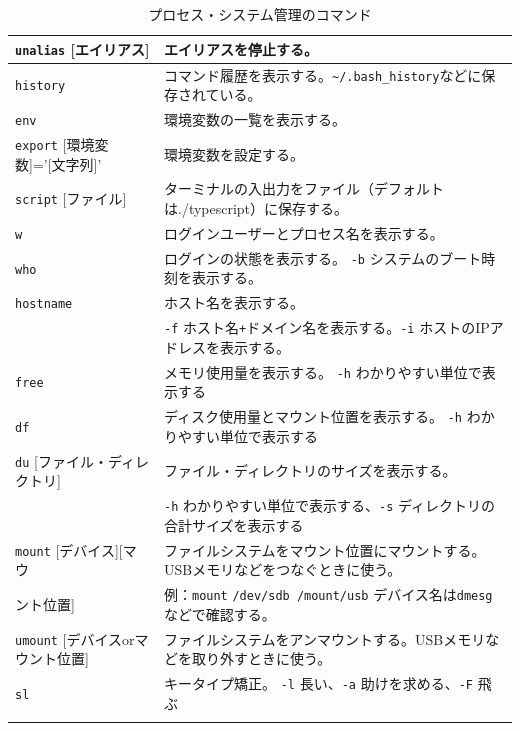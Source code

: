 \documentclass[a4j]{ltjreport}
\begin{document}
\begin{longtable}[c]{|p{3.5cm}|p{13.5cm}|}
        \hline
        \texttt{unalias} {\small [エイリアス]}&エイリアスを停止する。\\
        \hline
        \texttt{history} &コマンド履歴を表示する。\verb|~/.bash_history|などに保存されている。\\
        \hline
        \texttt{env} &環境変数の一覧を表示する。\\
        \hline
        \texttt{export} [環境変数]='[文字列]'&環境変数を設定する。\\
        \hline
        \texttt{script} [ファイル]&ターミナルの入出力をファイル（デフォルトは./typescript）に保存する。\\
        \hline
        \texttt{w} &ログインユーザーとプロセス名を表示する。\\
        \hline
        \texttt{who} &ログインの状態を表示する。 \texttt{-b} システムのブート時刻を表示する。\\
        \hline
        \texttt{hostname} &ホスト名を表示する。 \\
        &\texttt{-f} ホスト名\verb|+|ドメイン名を表示する。\texttt{-i} ホストのIPアドレスを表示する。\\
        \hline
        \texttt{free} &メモリ使用量を表示する。 \texttt{-h} わかりやすい単位で表示する\\
        \hline
        \texttt{df} &ディスク使用量とマウント位置を表示する。 \texttt{-h} わかりやすい単位で表示する\\
        \hline
        \texttt{du} {\footnotesize [ファイル・ディレクトリ]}&ファイル・ディレクトリのサイズを表示する。\\
        &\texttt{-h} わかりやすい単位で表示する、\texttt{-s} ディレクトリの合計サイズを表示する\\
        \hline
        \texttt{mount} [デバイス][マウ&ファイルシステムをマウント位置にマウントする。USBメモリなどをつなぐときに使う。\\
        ント位置]&例：\texttt{mount} \verb|/dev/sdb /mount/usb|  デバイス名は\texttt{dmesg}などで確認する。\\
        \hline
        \texttt{umount} [デバイスorマウント位置]&ファイルシステムをアンマウントする。USBメモリなどを取り外すときに使う。 \\
        \hline

        \texttt{sl}&キータイプ矯正。 \texttt{-l} 長い、\texttt{-a} 助けを求める、\texttt{-F} 飛ぶ\\
        \hline
        \caption{プロセス・システム管理のコマンド}
    \end{longtable}
\end{document}
